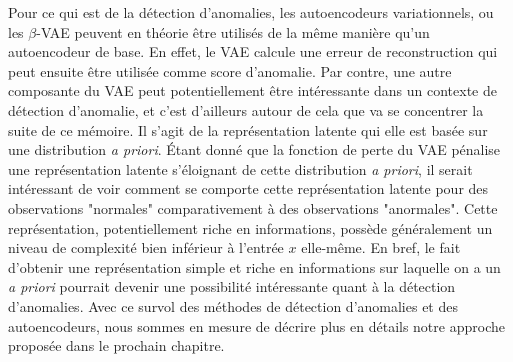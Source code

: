 Pour ce qui est de la détection d'anomalies, les autoencodeurs variationnels, ou les $\beta$-VAE peuvent en théorie être utilisés de la même manière qu'un autoencodeur de base. En effet, le VAE calcule une erreur de reconstruction qui peut ensuite être utilisée comme score d'anomalie. Par contre, une autre composante du VAE peut potentiellement être intéressante dans un contexte de détection d'anomalie, et c'est d'ailleurs autour de cela que va se concentrer la suite de ce mémoire. Il s'agit de la représentation latente qui elle est basée sur une distribution \textit{a priori}. Étant donné que la fonction de perte du VAE pénalise une représentation latente s'éloignant de cette distribution \textit{a priori}, il serait intéressant de voir comment se comporte cette représentation latente pour des observations "normales" comparativement à des observations "anormales". Cette représentation, potentiellement riche en informations, possède généralement un niveau de complexité bien inférieur à l'entrée $x$ elle-même. En bref, le fait d'obtenir une représentation simple et riche en informations sur laquelle on a un \textit{a priori} pourrait devenir une possibilité intéressante quant à la détection d'anomalies. Avec ce survol des méthodes de détection d'anomalies et des autoencodeurs, nous sommes en mesure de décrire plus en détails notre approche proposée dans le prochain chapitre.
